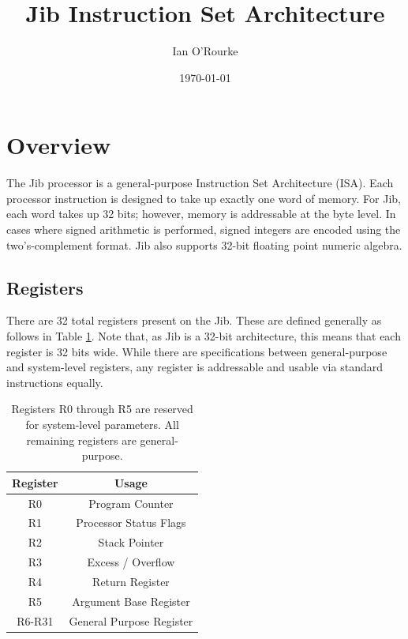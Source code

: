 \documentclass{article}
\title{Jib Instruction Set Architecture}
\author{Ian O'Rourke}
\date{\today \\ \titlelogoimage}
\begin{document}
\maketitle

\section{Overview}

The Jib processor is a general-purpose Instruction Set Architecture (ISA). Each processor instruction is designed to take up exactly one word of memory. For Jib, each word takes up 32 bits; however, memory is addressable at the byte level. In cases where signed arithmetic is performed, signed integers are encoded using the two's-complement format. Jib also supports 32-bit floating point numeric algebra.

\subsection{Registers}

There are 32 total registers present on the Jib. These are defined generally as follows in Table \ref{table:register-setup}. Note that, as Jib is a 32-bit architecture, this means that each register is 32 bits wide. While there are specifications between general-purpose and system-level registers, any register is addressable and usable via standard instructions equally.

\begin{table}[h!]
    \centering
    \begin{tabular}{c|c}
        \hline
        Register & Usage \\
        \hline
        R0 & Program Counter \\
        R1 & Processor Status Flags \\
        R2 & Stack Pointer \\
        R3 & Excess / Overflow \\
        R4 & Return Register \\
        R5 & Argument Base Register \\
        R6-R31 & General Purpose Register \\
        \hline
    \end{tabular}
    \caption{Registers R0 through R5 are reserved for system-level parameters. All remaining registers are general-purpose.}
    \label{table:register-setup}
\end{table}
\end{document}
